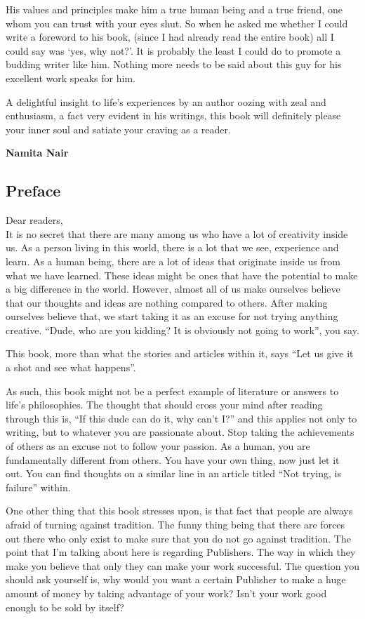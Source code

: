 \documentclass[twoside,11pt,titlepage]{article}
\begin{document}
His values and principles make him a true human being and a true friend, one whom you can trust with your eyes shut. So when he asked me whether I could write a foreword to his book, (since I had already read the entire book) all I could say was `yes, why not?'. It is probably the least I could do to promote a budding writer like him. Nothing more needs to be said about this guy for his excellent work speaks for him.

A delightful insight to life's experiences by an author oozing with zeal and enthusiasm, a fact very evident in his writings, this book will definitely please your inner soul and satiate your craving as a reader.

\textbf{Namita Nair}
\newpage
\begin{center}
  \section{Preface}
\end{center}
Dear readers,\\

It is no secret that there are many among us who have a lot of creativity inside us. As a person living in this world, there is a lot that we see, experience and learn. As a human being, there are a lot of ideas that originate inside us from what we have learned. These ideas might be ones that have the potential to make a big difference in the world. However, almost all of us make ourselves believe that our thoughts and ideas are nothing compared to others. After making ourselves believe that, we start taking it as an excuse for not trying anything creative. ``Dude, who are you kidding? It is obviously not going to work'', you say.

This book, more than what the stories and articles within it, says ``Let us give it a shot and see what happens''.

As such, this book might not be a perfect example of literature or answers to life's philosophies. The thought that should cross your mind after reading through this is, ``If this dude can do it, why can't I?'' and this applies not only to writing, but to whatever you are passionate about. Stop taking the achievements of others as an excuse not to follow your passion. As a human, you are fundamentally different from others. You have your own thing, now just let it out. You can find thoughts on a similar line in an article titled ``Not trying, is failure'' within.

One other thing that this book stresses upon, is that fact that people are always afraid of turning against tradition. The funny thing being that there are forces out there who only exist to make sure that you do not go against tradition. The point that I'm talking about here is regarding Publishers. The way in which they make you believe that only they can make your work successful. The question you should ask yourself is, why would you want a certain Publisher to make a huge amount of money by taking advantage of your work? Isn't your work good enough to be sold by itself? 
\end{document}
